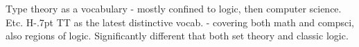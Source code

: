 \documentclass[12pt,toc]{tufte-handout}
\theoremstyle{plain}
\def\HoTT{%
  H\kern-.7pt
  {\tiny\raisebox{1pt}{o}}%
  \kern-1.5pt
  TT}
\begin{document}
{\todo Type theory as a vocabulary - mostly confined to logic, then
  computer science.  Etc.  \HoTT{} as the latest distinctive vocab. -
  covering both math and compsci, also regions of logic.
  Significantly different that both set theory and classic logic.}



\clearpage
\appendix
\begin{appendices}








\end{appendices}
\end{document}
